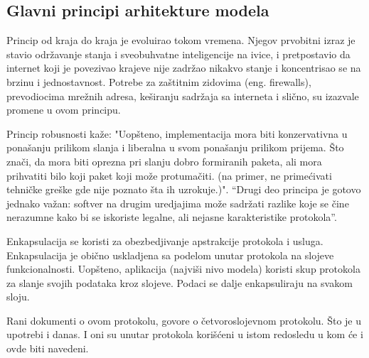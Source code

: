 \documentclass[a4paper,12pt, master]{etf}
\begin{document}
	\subsection{Glavni principi arhitekture modela}

	Princip od kraja do kraja je evoluirao tokom vremena. Njegov prvobitni
	izraz je stavio	odr\v{z}avanje stanja i sveobuhvatne inteligencije na ivice,
	 i pretpostavio da internet koji je	povezivao krajeve nije zadr\v{z}ao
	nikakvo stanje i koncentrisao se na brzinu i jednostavnost. Potrebe za
	za\v{s}titnim zidovima (eng\@. firewalls), prevodiocima mre\v{z}nih adresa,
    ke\v{s}iranju sadr\v{z}aja sa interneta i sli\v{c}no, su izazvale promene u
    ovom principu.

	Princip robusnosti ka\v{z}e: "Uop\v{s}teno, implementacija mora biti
	konzervativna u pona\v{s}anju prilikom slanja i liberalna u svom
	pona\v{s}anju prilikom prijema. \v{S}to zna\v{c}i, da mora biti
	oprezna pri slanju dobro formiranih paketa, ali mora prihvatiti bilo koji
    paket koji mo\v{z}e protuma\v{c}iti. (na primer, ne prime\'{c}ivati
    tehni\v{c}ke gre\v{s}ke gde nije poznato \v{s}ta ih uzrokuje.)". ``Drugi deo
    principa je gotovo jednako va\v{z}an: softver na drugim uredjajima mo\v{z}e
    sadr\v{z}ati razlike koje se \v{c}ine nerazumne kako bi se iskoriste
    legalne, ali nejasne karakteristike protokola''.

	Enkapsulacija se koristi za obezbedjivanje apstrakcije protokola i usluga.
	Enkapsulacija je obi\v{c}no uskladjena sa podelom unutar protokola na
	slojeve funkcionalnosti. Uop\v{s}teno, aplikacija (najvi\v{s}i nivo modela)
	koristi skup protokola za slanje svojih podataka kroz slojeve. Podaci se
	dalje enkapsuliraju na svakom sloju.

	Rani dokumenti o ovom protokolu, govore o \v{c}etvoroslojevnom protokolu.
	\v{S}to je u upotrebi i	danas. I oni su unutar protokola kori\v{s}\'{c}eni
	u istom redosledu u kom \'{c}e i ovde biti navedeni.
\end{document}
